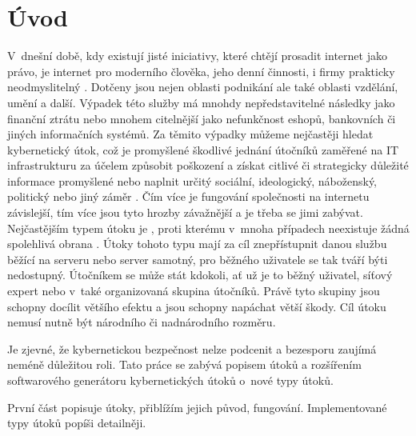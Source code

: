 \chapter*{Úvod}
{}


V~dnešní době, kdy existují jisté iniciativy, které chtějí prosadit internet jako právo, je internet 
pro moderního člověka, jeho denní činnosti, i firmy prakticky neodmyslitelný \cite{pirati_internet}. 
Dotčeny jsou nejen oblasti podnikání ale také oblasti vzdělání, umění a další. Výpadek této služby má 
mnohdy nepředstavitelné následky jako finanční ztrátu nebo mnohem citelnější jako nefunkčnost eshopů, 
bankovních či jiných informačních systémů. Za těmito výpadky můžeme nejčastěji hledat kybernetický útok, 
což je promyšlené škodlivé jednání útočníků zaměřené na  IT  infrastrukturu  za  účelem  způsobit 
poškození  a  získat  citlivé  či  strategicky  důležité 
informace promyšlené nebo naplnit určitý sociální, ideologický, náboženský, politický nebo jiný záměr 
\cite{Jirasek2012}. Čím více je fungování společnosti na internetu závislejší, tím více jsou tyto hrozby 
závažnější a je třeba se jimi zabývat. Nejčastějším typem útoku je , proti kterému 
v~mnoha případech neexistuje  žádná spolehlivá obrana \cite{akamai_q2_2017}. Útoky tohoto typu mají 
za cíl znepřístupnit danou službu běžící na serveru nebo server samotný, pro běžného uživatele se tak 
tváří býti nedostupný. Útočníkem se může stát kdokoli, ať už je to běžný uživatel, síťový expert nebo 
v~také organizovaná skupina útočníků. Právě tyto skupiny jsou schopny docílit většího efektu a jsou 
schopny napáchat větší škody. Cíl útoku nemusí nutně být národního či nadnárodního rozměru.

Je zjevné, že kybernetickou bezpečnost nelze podcenit a bezesporu zaujímá neméně důležitou roli. Tato 
práce se zabývá popisem  útoků a rozšířením softwarového generátoru kybernetických útoků 
o~nové typy útoků.

První část popisuje  útoky, přiblížím jejich původ, fungování. Implementované typy útoků 
popíši detailněji.